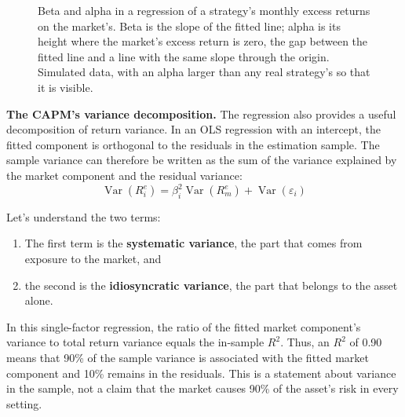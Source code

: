 \begin{figure}[!htbp]
\caption{Beta and alpha in a regression of a strategy's monthly excess returns on the market's. Beta is the slope of the fitted line; alpha is its height where the market's excess return is zero, the gap between the fitted line and a line with the same slope through the origin. Simulated data, with an alpha larger than any real strategy's so that it is visible.}
\label{fig:03-alpha}
\end{figure}

\textbf{The CAPM's variance decomposition.} The regression also provides a useful decomposition of return variance. In an OLS regression with an intercept, the fitted component is orthogonal to the residuals in the estimation sample. The sample variance can therefore be written as the sum of the variance explained by the market component and the residual variance:
\begin{equation}
  \operatorname{Var}(R^{e}_{i}) = \beta_i^2 \operatorname{Var}(R^{e}_{m}) + \operatorname{Var}(\varepsilon_i)
  \label{eq:03-vardec-capm}
\end{equation}

Let's understand the two terms:
\begin{enumerate}
\item The first term is the \textbf{systematic variance}, the part that comes from exposure to the market, and 
\item the second is the \textbf{idiosyncratic variance}, the part that belongs to the asset alone. 
\end{enumerate}
In this single-factor regression, the ratio of the fitted market component's variance to total return variance equals the in-sample $R^2$. Thus, an $R^2$ of 0.90 means that 90\% of the sample variance is associated with the fitted market component and 10\% remains in the residuals. This is a statement about variance in the sample, not a claim that the market causes 90\% of the asset's risk in every setting.

